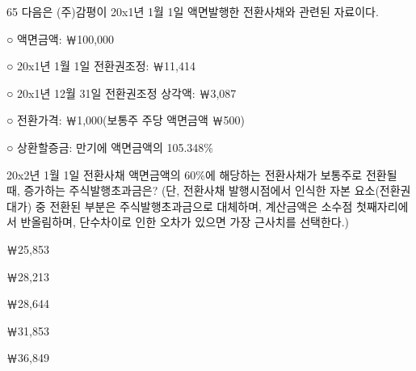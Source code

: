 \begin{question}{65}
다음은 (주)감평이 20x1년 1월 1일 액면발행한 전환사채와 관련된 자료이다.
\begin{framedtext}
○ 액면금액: ￦100,000 \par
○ 20x1년 1월 1일 전환권조정: ￦11,414 \par
○ 20x1년 12월 31일 전환권조정 상각액: ￦3,087 \par
○ 전환가격: ￦1,000(보통주 주당 액면금액 ￦500) \par
○ 상환할증금: 만기에 액면금액의 105.348\% \par
\end{framedtext}
20x2년 1월 1일 전환사채 액면금액의 60\%에 해당하는 전환사채가 보통주로 전환될 때, 증가하는 주식발행초과금은? (단, 전환사채 발행시점에서 인식한 자본 요소(전환권대가) 중 전환된 부분은 주식발행초과금으로 대체하며, 계산금액은 소수점 첫째자리에서 반올림하며, 단수차이로 인한 오차가 있으면 가장 근사치를 선택한다.)
\begin{choices}
  \item ￦25,853
  \item ￦28,213
  \item ￦28,644
  \item ￦31,853
  \item ￦36,849
\end{choices}
\end{question}
